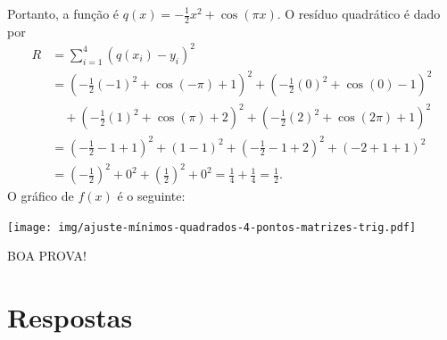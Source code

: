 \documentclass[12pt,a4paper]{article}
\begin{document}
\begin{ExerciseList}
Portanto, a função é $q(x) = -\frac{1}{2}x^2 + \cos(\pi x)$. O resíduo quadrático é dado por
\begin{align*}
R
&= \sum_{i=1}^{4} (q(x_i) - y_i)^2 \\
&= \left(-\frac{1}{2}(-1)^2 + \cos(-\pi) + 1\right)^2 + \left(-\frac{1}{2}(0)^2 + \cos(0) - 1\right)^2 \\
&\quad + \left(-\frac{1}{2}(1)^2 + \cos(\pi) + 2\right)^2 + \left(-\frac{1}{2}(2)^2 + \cos(2\pi) + 1\right)^2 \\
&= \left(-\frac{1}{2} - 1 + 1\right)^2 + (1 - 1)^2 + \left(-\frac{1}{2} - 1 + 2\right)^2 + \left(-2 + 1 + 1\right)^2 \\
&= \left(-\frac{1}{2}\right)^2 + 0^2 + \left(\frac{1}{2}\right)^2 + 0^2 = \frac{1}{4} + \frac{1}{4} = \boxed{\frac{1}{2}}.
\end{align*}
O gráfico de $f(x)$ é o seguinte:
\begin{center}
  \texttt{[image: img/ajuste-mínimos-quadrados-4-pontos-matrizes-trig.pdf]}
\end{center}
\end{ExerciseList}

\vfill
\begin{center}
BOA PROVA!
\end{center}

\newpage
\restoregeometry
\section*{Respostas}
\shipoutAnswer
\end{document}
